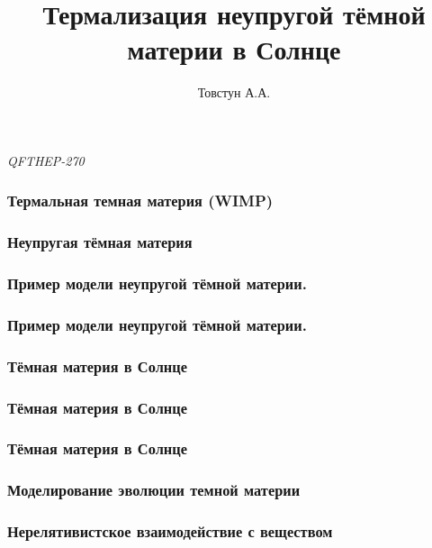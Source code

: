 


\title{Термализация неупругой тёмной материи в Солнце} 
\author[]{Товстун А.А.}

	
	\begin{frame}
		\titlepage %
		{
			\centering
			\textit{QFTHEP-270} \\
			\par
		}
	\end{frame}
	
%		
	
	\begin{frame}
		\frametitle{Термальная темная материя (WIMP)}
		
	\end{frame}
	
	\begin{frame}
		\frametitle{Неупругая тёмная материя}
		
	\end{frame}
	
	\begin{frame}
		\frametitle{Пример модели неупругой тёмной материи.}
		
	\end{frame}
	
	\begin{frame}
		\frametitle{Пример модели неупругой тёмной материи.}
		
	\end{frame}
	
	
	\begin{frame}
		\frametitle{Тёмная материя в Солнце}
		
	\end{frame}
	
	\begin{frame}
		\frametitle{Тёмная материя в Солнце}
		
	\end{frame}
	
	\begin{frame}
		\frametitle{Тёмная материя в Солнце}
		
	\end{frame}

	
	\begin{frame}
	\frametitle{Моделирование эволюции темной материи}
	
	\end{frame}
	
	\begin{frame}
		\frametitle{Нерелятивистское взаимодействие с веществом}
		
	\end{frame}
	
